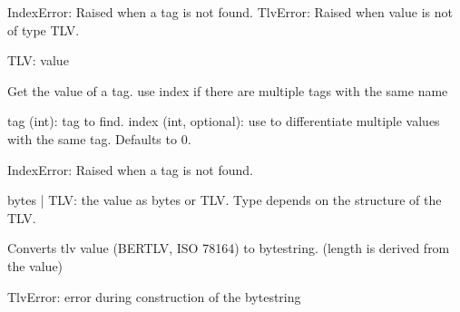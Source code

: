 \documentclass[letterpaper,10pt,english]{sphinxmanual}
\begin{document}
\begin{fulllineitems}
\begin{fulllineitems}
\begin{description}
\sphinxAtStartPar
IndexError: Raised when a tag is not found.
TlvError: Raised when value is not of type TLV.

\sphinxAtStartPar
TLV: value

\end{description}

\end{fulllineitems}


\begin{fulllineitems}
\label{\detokenize{aliro_actuator.access_protocol.tlv:aliro_actuator.access_protocol.tlv.TLV.get_value}}
\pysigstartsignatures
{}
\pysigstopsignatures
\sphinxAtStartPar
Get the value of a tag. use index if there are multiple tags with the same name
\begin{description}
\sphinxAtStartPar
tag (int): tag to find.
index (int, optional): use to differentiate multiple values with the same
tag. Defaults to 0.

\sphinxAtStartPar
IndexError: Raised when a tag is not found.

\sphinxAtStartPar
bytes | TLV: the value as bytes or TLV. Type depends on the structure of
the TLV.

\end{description}

\end{fulllineitems}


\begin{fulllineitems}
\label{\detokenize{aliro_actuator.access_protocol.tlv:aliro_actuator.access_protocol.tlv.TLV.to_bytes}}
\pysigstartsignatures
{}
\pysigstopsignatures
\sphinxAtStartPar
Converts tlv value (BER\sphinxhyphen{}TLV, ISO 7816\sphinxhyphen{}4) to bytestring.
(length is derived from the value)
\begin{description}
\sphinxAtStartPar
TlvError: error during construction of the bytestring


\end{description}
\end{fulllineitems}
\end{fulllineitems}
\end{document}
